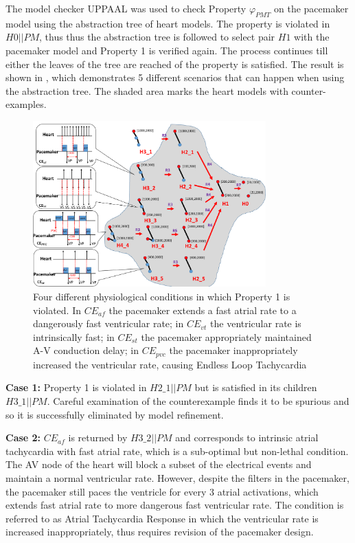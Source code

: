 The model checker UPPAAL was used to check Property $\varphi_{PMT}$ on the pacemaker model using the abstraction tree of heart models.
The property is violated in $H0 || PM$, thus thus the abstraction tree is followed to select pair $H1$ with the pacemaker model and Property 1 is verified again.
The process continues till either the leaves of the tree are reached of the property is satisfied.
The result is shown in , which demonstrates 5 different scenarios that can happen when using the abstraction tree.
The shaded area marks the heart models with counter-examples.
\begin{figure}[!t]
	\centering
	\includegraphics[width=0.8\textwidth]{figs/tree.pdf}
	\caption{\small Four different physiological conditions in which Property 1 is violated. In $CE_{af}$ the pacemaker extends a fast atrial rate to a dangerously fast ventricular rate; in $CE_{vt}$ the ventricular rate is intrinsically fast; in $CE_{st}$ the pacemaker appropriately maintained A-V conduction delay; in $CE_{pvc}$ the pacemaker inappropriately increased the ventricular rate, causing Endless Loop Tachycardia}
	\label{fig:CE}
\end{figure}

\textbf{Case 1:} Property 1 is violated in $H2\_1 || PM$ but is satisfied in its children $H3\_1 || PM$.
Careful examination of the counterexample finds it to be spurious and so it is successfully eliminated by model refinement.

\textbf{Case 2:} $CE_{af}$ is returned by $H3\_2 || PM$ and corresponds to intrinsic atrial tachycardia with fast atrial rate, which is a sub-optimal but non-lethal condition.
The AV node of the heart will block a subset of the electrical events and maintain a normal ventricular rate.
However, despite the filters in the pacemaker, the pacemaker still paces the ventricle for every 3 atrial activations, which extends fast atrial rate to more dangerous fast ventricular rate. 
The condition is referred to as Atrial Tachycardia Response in which the ventricular rate is increased inappropriately, thus requires revision of the pacemaker design.

